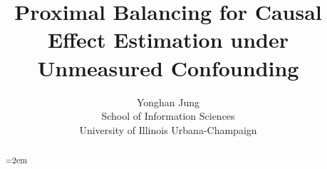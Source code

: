 \documentclass[letterpaper,11pt]{scrartcl}
\title{Proximal Balancing for Causal Effect Estimation under Unmeasured Confounding}
\author{Yonghan Jung\\[0.3em]\normalsize School of Information Sciences\\\normalsize University of Illinois Urbana-Champaign}
\date{}
\begin{document}
\maketitle
\allowdisplaybreaks

\begin{abstract}
\emergencystretch=2em

\end{abstract}

\tableofcontents
\newpage

\begingroup
\allowdisplaybreaks
\sloppy






\endgroup

\newpage




\begingroup
\allowdisplaybreaks
\sloppy





\endgroup
\end{document}
